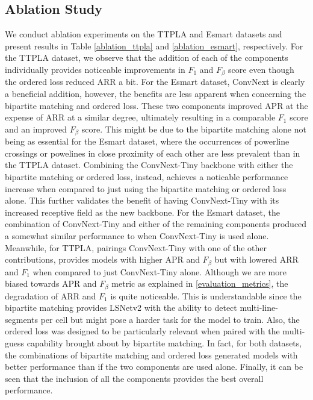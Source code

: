 \documentclass[journal]{IEEEtran}
\begin{document}
\subsection{Ablation Study}
We conduct ablation experiments on the TTPLA and Esmart datasets and present results in Table \ref{ablation_ttpla} and \ref{ablation_esmart}, respectively. For the TTPLA dataset, we observe that the addition of each of the components individually provides noticeable improvements in $F_1$ and $F_{\beta}$ score even though the ordered loss reduced ARR a bit. 
For the Esmart dataset, ConvNext is clearly a beneficial addition, however, the benefits are less apparent when concerning the bipartite matching and ordered loss. These two components improved APR at the expense of ARR at a similar degree, ultimately resulting in a comparable $F_1$ score and an improved $F_{\beta}$ score. This might be due to the bipartite matching alone not being as essential for the Esmart dataset, where the occurrences of powerline crossings or powelines in close proximity of each other are less prevalent than in the TTPLA dataset. Combining the ConvNext-Tiny backbone with either the bipartite matching or ordered loss, instead, achieves a noticable performance increase when compared to just using the bipartite matching or ordered loss alone. This further validates the benefit of having ConvNext-Tiny with its increased receptive field as the new backbone. For the Esmart dataset, the combination of ConvNext-Tiny and either of the remaining components produced a somewhat similar performance to when ConvNext-Tiny is used alone. Meanwhile, for TTPLA, pairings ConvNext-Tiny with one of the other contributions, provides models with higher APR and $F_{\beta}$ but with lowered ARR and $F_1$ when compared to just ConvNext-Tiny alone. Although we are more biased towards APR and $F_{\beta}$ metric as explained in \ref{evaluation_metrics}, the degradation of ARR and $F_1$ is quite noticeable. This is understandable since the bipartite matching provides LSNetv2 with the ability to detect multi-line-segments per cell but might pose a harder task for the model to train. Also, the ordered loss was designed to be particularly relevant when paired with the multi-guess capability brought about by bipartite matching. In fact, for both datasets, the combinations of bipartite matching and ordered loss generated models with better performance than if the two components are used alone. Finally, it can be seen that the inclusion of all the components provides the best overall performance.
\end{document}
